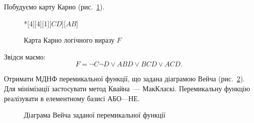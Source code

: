 \documentclass[a4paper,oneside,DIV=12,12pt]{scrartcl}
\begin{document}
\begin{solution}
		Побудуємо карту Карно (рис.~\ref{fig:task2-karnaugh-map}).
		\begin{figure}
		\centering
			\begin{karnaugh-map}*[4][4][1][$CD$][$AB$]
			\end{karnaugh-map}
		\caption{Карта Карно логічного виразу $F$}
		\label{fig:task2-karnaugh-map}
		\end{figure}
		Звідси маємо:
		\[
			F = \neg{C} \neg{D} \lor ABD \lor BCD \lor ACD.
		\]
	\end{solution}
	
	\begin{exercise}
		Отримати МДНФ перемикальної функції, що задана діаграмою Вейча (рис.~\ref{fig:task3-veitch-diagram}). Для мінімізації застосувати метод Квайна~--- МакКласкі. Перемикальну функцію реалізувати в елементному базисі АБО---НЕ.
		
		\begin{figure}[!htbp]
		\centering
		\caption{Діаграма Вейча заданої перемикальної функції}
		\label{fig:task3-veitch-diagram}
		\end{figure}
		
	\end{exercise}
	
\end{document}

